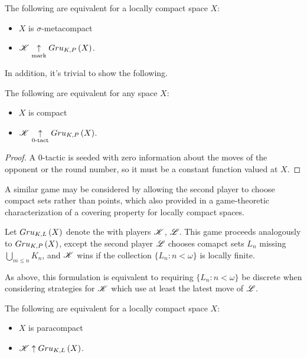 \begin{thm}
  The following are equivalent for a locally compact space $X$:
    \begin{itemize}
      \item $X$ is $\sigma$-metacompact
      \item $\mathscr{K} \underset{\text{mark}}{\uparrow} Gru_{K,P}\left({X}\right)$.
    \end{itemize}
\end{thm}

In addition, it's trivial to show the following.

\begin{prop}
  The following are equivalent for any space $X$:
    \begin{itemize}
      \item $X$ is compact
      \item $\mathscr{K} \underset{0\text{-tact}}{\uparrow} Gru_{K,P}\left({X}\right)$.
    \end{itemize}
\end{prop}

\begin{proof}
  A $0$-tactic is seeded with zero information about the moves of the opponent
  or the round number, so it must be a constant function valued at $X$.
\end{proof}

A similar game may be considered by allowing the second player to choose
compact sets rather than points, which also provided in \cite{MR858337}
a game-theoretic characterization of a covering property for locally compact
spaces.

\begin{game}
  Let $Gru_{K,L}\left({X}\right)$ denote the 
  with players $\mathscr{K}$, $\mathscr{L}$. This game proceeds analogously to
  $Gru_{K,P}\left({X}\right)$, except the second player $\mathscr{L}$ chooses comapct sets $L_n$
  missing $\bigcup_{m\leq n}K_n$,
  and $\mathscr{K}$ wins if the collection $\{L_n:n<\omega\}$ is locally finite.
\end{game}

As above, this formulation is equivalent to requiring $\{L_n:n<\omega\}$ be
discrete when considering strategies for $\mathscr{K}$ which use at least the latest
move of $\mathscr{L}$.

\begin{thm}
  The following are equivalent for a locally compact space $X$:
    \begin{itemize}
      \item $X$ is paracompact
      \item $\mathscr{K} \uparrow Gru_{K,L}\left({X}\right)$.
    \end{itemize}
\end{thm}


